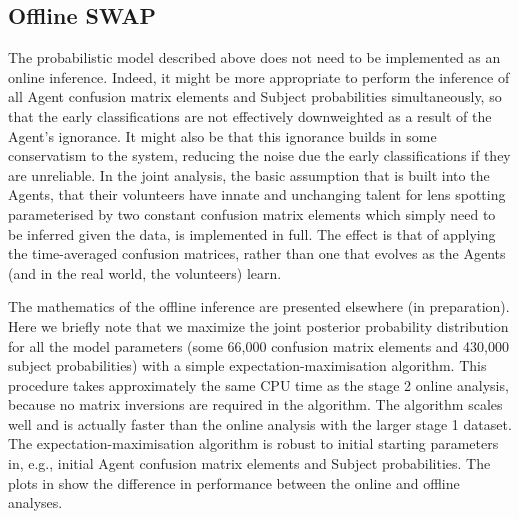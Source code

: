 \documentclass[useAMS,usenatbib,a4paper]{mn2e}
\begin{document}


\subsection{Offline SWAP}
\label{appendix:swap:offline}

The probabilistic model described above does not need to be implemented as an
online inference. Indeed, it might be more appropriate to perform the inference
of all Agent confusion matrix elements and Subject probabilities
simultaneously, so that the early classifications are not effectively
downweighted as a result of the Agent's ignorance. It might also be that this
ignorance builds in some conservatism to the system, reducing the noise due
the early classifications if they are unreliable. In the joint analysis, the
basic assumption that is built into the Agents, that their volunteers
have innate and unchanging talent for lens spotting parameterised by two 
constant confusion matrix elements which simply need to be inferred given the
data, is implemented in full. The effect is that of applying the time-averaged
confusion matrices, rather than one that evolves as the Agents (and in the
real world, the volunteers) learn. 

The mathematics of the offline inference are presented elsewhere (in
preparation). Here we briefly note that we maximize the joint posterior
probability distribution for all the model parameters (some 66,000 confusion
matrix elements and 430,000 subject probabilities) with a simple
expectation-maximisation algorithm. This procedure takes approximately the
same CPU time as the stage 2 online analysis, because no matrix inversions are
required in the algorithm. The algorithm scales well and is actually faster
than the online analysis with the larger stage 1 dataset. The
expectation-maximisation algorithm is robust to initial starting parameters
in, e.g., initial Agent confusion matrix elements and Subject probabilities.
The plots in  show the difference in performance
between the online and offline analyses. 
\end{document}

